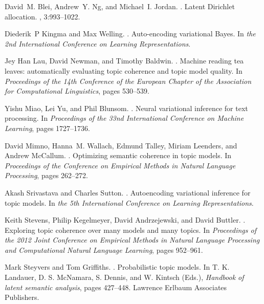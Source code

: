 \documentclass[10pt]{article}
\begin{document}
\begin{thebibliography}{}

David~M. Blei, Andrew~Y. Ng, and Michael~I. Jordan.
.
\newblock Latent Dirichlet allocation.
, 3:993–1022.

Diederik~P Kingma and Max Welling.
.
\newblock Auto-encoding variational Bayes.
\newblock In {\em the 2nd International Conference on Learning Representations}.

Jey Han Lau, David Newman, and Timothy Baldwin.
.
\newblock Machine reading tea leaves: automatically evaluating topic coherence and topic model quality.
\newblock In {\em Proceedings of the 14th Conference of the European Chapter of the Association for Computational Linguistics}, pages 530–539.

Yishu Miao, Lei Yu, and Phil Blunsom.
.
\newblock Neural variational inference for text processing.
\newblock In {\em Proceedings of the 33nd International Conference on Machine Learning}, pages 1727–1736.

David Mimno, Hanna~M. Wallach, Edmund Talley, Miriam Leenders, and Andrew McCallum.
.
\newblock Optimizing semantic coherence in topic models.
\newblock In {\em Proceedings of the Conference on Empirical Methods in Natural Language Processing}, pages 262–272.

Akash Srivastava and Charles Sutton.
.
\newblock Autoencoding variational inference for topic models.
\newblock In {\em the 5th International Conference on Learning Representations}.

Keith Stevens, Philip Kegelmeyer, David Andrzejewski, and David Buttler.
.
\newblock Exploring topic coherence over many models and many topics.
\newblock In {\em Proceedings of the 2012 Joint Conference on Empirical Methods in Natural Language Processing and Computational Natural Language Learning}, pages 952–961.

Mark Steyvers and Tom Griffiths.
.
\newblock Probabilistic topic models.
\newblock In T. K. Landauer, D. S. McNamara, S. Dennis, and W. Kintsch (Eds.), {\em Handbook of latent semantic analysis}, pages 427–448.
\newblock Lawrence Erlbaum Associates Publishers.


\end{thebibliography}
\end{document}
